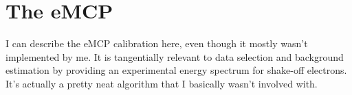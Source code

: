


\section{The eMCP}
	I can describe the eMCP calibration here, even though it mostly wasn't implemented by me.  It is tangentially relevant to data selection and background estimation by providing an experimental energy spectrum for shake-off electrons.  It's actually a pretty neat algorithm that I basically wasn't involved with.



